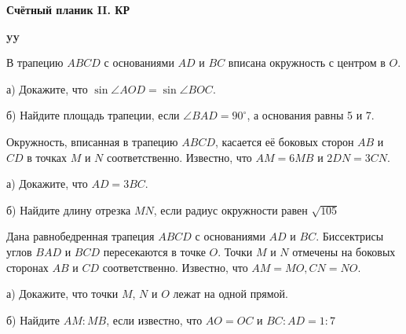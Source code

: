 \centerline{\bf \Huge Счётный планик II. КР}
\centerline{\bf \Huge }

\begin{flushright}
        \scriptsize{\textbf{yy}}
\end{flushright}


 В трапецию $ABCD$ с основаниями $AD$ и $BC$ вписана окружность с центром в $O$.

а) Докажите, что $\sin \angle AOD = \sin \angle BOC$.

б) Найдите площадь трапеции, если $\angle BAD = 90^{\circ}$, а основания равны 5 и 7.

 Окружность, вписанная в трапецию $ABCD$, касается её боковых сторон $AB$ и $CD$ в точках
$M$ и $N$ соответственно. Известно, что $AM = 6MB$ и $2DN = 3CN$.

а) Докажите, что $AD = 3BC$.

б) Найдите длину отрезка $MN$, если радиус окружности равен $\sqrt{105}$

 Дана равнобедренная трапеция $ABCD$ с основаниями $AD$ и $BC$. Биссектрисы углов $BAD$
и $BCD$ пересекаются в точке $O$. Точки $M$ и $N$ отмечены на боковых сторонах $AB$ и $CD$
соответственно. Известно, что $AM = MO, CN = NO$.

а) Докажите, что точки $M$, $N$ и $O$ лежат на одной прямой.

б) Найдите $AM : MB$, если известно, что $AO = OC$ и $BC : AD = 1 : 7$